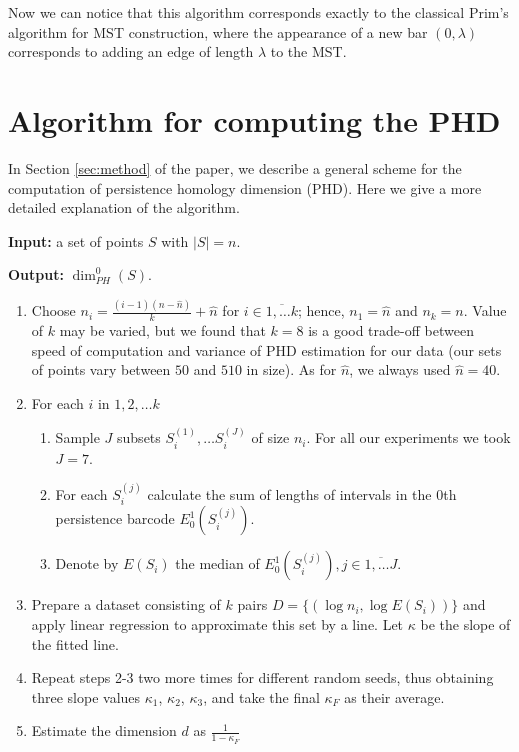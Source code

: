 \documentclass{article}
\begin{document}
Now we can notice that this algorithm  corresponds exactly to the classical Prim's algorithm for MST construction, where the appearance of a new bar $(0,\lambda)$ corresponds to adding an edge of length $\lambda$ to the MST.




\section{Algorithm for computing the PHD}

In Section \ref{sec:method} of the paper, we describe a general scheme for the computation of persistence homology dimension (PHD). Here we give a more detailed explanation of the algorithm.

\textbf{Input: } a set of points $S$ with $|S| = n$. 

\textbf{Output: } $\dim_{PH}^0 (S)$. 

\begin{enumerate}
    \item Choose $n_i = \frac{(i - 1) (n - \hat{n})}{k} + \hat{n}$ for $i \in \overline{1, \ldots k}$; hence, $n_1 = \hat{n}$ and $n_k = n$. Value of $k$ may be varied, but we found that $k = 8$ is a good trade-off between speed of computation and variance of PHD estimation for our data (our sets of points vary between $50$ and $510$ in size). As for $\hat{n}$, we always used $\hat{n} = 40$. 
    \item For each $i$ in $1, 2, \ldots k$ 
    \begin{enumerate}
        \item Sample $J$ subsets $S_i^{(1)}, \ldots S_i^{(J)}$ of size $n_i$. For all our experiments we took $J = 7$.
        \item For each  $S_i^{(j)}$ calculate the sum of lengths of intervals in the 0th persistence barcode $E_0^1(S_i^{(j)})$.
        \item Denote by $E(S_i)$ the median of $E_0^1(S_i^{(j)}), j \in \overline{1, \ldots J}$. 
    \end{enumerate}
    \item Prepare a dataset consisting of $k$ pairs $D=\{(\log n_i, \log E(S_i))\}$ and apply linear regression to approximate this set by a line. Let $\kappa$ be the slope of the fitted line. 

    \item Repeat steps 2-3 two more times for different random seeds, thus obtaining three slope values $\kappa_1$, $\kappa_2$, $\kappa_3$, and take the final $\kappa_F$ as their average.     
    \item Estimate the dimension $d$ as $\frac{1}{1-\kappa_F}$
\end{enumerate}
\end{document}
